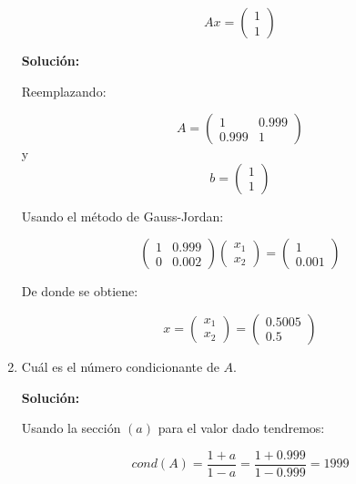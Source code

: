 \begin{enumerate}[label=(\alph*)]
    $$Ax=\begin{pmatrix}
                1\\ 
                1
            \end{pmatrix}$$
            
    \textbf{Solución:}
    
    Reemplazando:
    
    $$
    A=\begin{pmatrix}
                1 & 0.999\\ 
                0.999 & 1
            \end{pmatrix}
    $$  y $$b=\begin{pmatrix}
                1\\ 
                1
            \end{pmatrix}$$
    
    Usando el método de Gauss-Jordan:
    
    $$
    \begin{pmatrix}
        1 & 0.999\\ 
        0 & 0.002
    \end{pmatrix}
    \begin{pmatrix}
        x_1\\ 
        x_2
    \end{pmatrix}
    =\begin{pmatrix}
        1\\ 
        0.001
    \end{pmatrix}
    $$
    
    De donde se obtiene:
    
    $$
    x=\begin{pmatrix}
        x_1\\ 
        x_2
    \end{pmatrix}
    =\begin{pmatrix}
        0.5005\\ 
        0.5
    \end{pmatrix}
    $$
    
    \item Cuál es el número condicionante de $A$.
    
    \textbf{Solución:}
    
    Usando la sección $(a)$ para el valor dado tendremos:
    
    $$
    cond(A)=\frac{1+a}{1-a}=\frac{1+0.999}{1-0.999}=1999
    $$
    
\end{enumerate}
